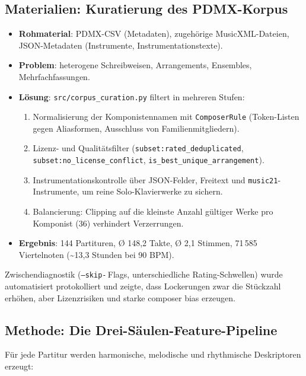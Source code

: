 \documentclass[12pt,a4paper]{article}
\theoremstyle{definition}
\begin{document}
\subsection{Materialien: Kuratierung des PDMX-Korpus}
\begin{itemize}
    \item \textbf{Rohmaterial}: PDMX-CSV (Metadaten), zugehörige MusicXML-Dateien, JSON-Metadaten (Instrumente, Instrumentationstexte).
    \item \textbf{Problem}: heterogene Schreibweisen, Arrangements, Ensembles, Mehrfachfassungen.
    \item \textbf{Lösung}: \texttt{src/corpus\_curation.py} filtert in mehreren Stufen:
    \begin{enumerate}
        \item Normalisierung der Komponistennamen mit \texttt{ComposerRule} (Token-Listen gegen Aliasformen, Ausschluss von Familienmitgliedern).
        \item Lizenz- und Qualitätsfilter (\texttt{subset:rated\_deduplicated}, \texttt{subset:no\_license\_conflict}, \texttt{is\_best\_unique\_arrangement}).
        \item Instrumentationskontrolle über JSON-Felder, Freitext und \texttt{music21}-Instrumente, um reine Solo-Klavierwerke zu sichern.
        \item Balancierung: Clipping auf die kleinste Anzahl gültiger Werke pro Komponist (36) verhindert Verzerrungen.
    
    \end{enumerate}
    \item \textbf{Ergebnis}: 144 Partituren, Ø 148{,}2 Takte, Ø 2,1 Stimmen, 71\,585 Viertelnoten (\textasciitilde13,3 Stunden bei 90 BPM).
\end{itemize}

Zwischendiagnostik (\texttt{--skip-}\,Flags, unterschiedliche Rating-Schwellen) wurde automatisiert protokolliert und zeigte, dass Lockerungen zwar die Stückzahl erhöhen, aber Lizenzrisiken und starke composer bias erzeugen.

\subsection{Methode: Die Drei-Säulen-Feature-Pipeline}
Für jede Partitur werden harmonische, melodische und rhythmische Deskriptoren erzeugt:
\end{document}
